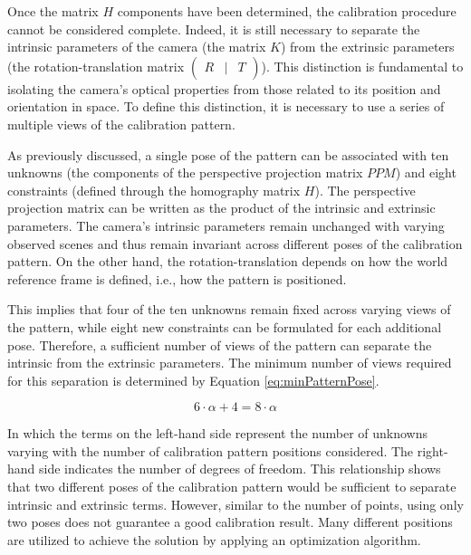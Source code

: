 Once the matrix $H$ components have been determined, the calibration procedure cannot be considered complete. Indeed, it is still necessary to separate the intrinsic parameters of the camera (the matrix $K$) from the extrinsic parameters (the rotation-translation matrix $\begin{pmatrix} R & | & T \end{pmatrix}$).  
This distinction is fundamental to isolating the camera's optical properties from those related to its position and orientation in space.  
To define this distinction, it is necessary to use a series of multiple views of the calibration pattern.

As previously discussed, a single pose of the pattern can be associated with ten unknowns (the components of the perspective projection matrix $PPM$) and eight constraints (defined through the homography matrix $H$).  
The perspective projection matrix can be written as the product of the intrinsic and extrinsic parameters.  
The camera's intrinsic parameters remain unchanged with varying observed scenes and thus remain invariant across different poses of the calibration pattern.  
On the other hand, the rotation-translation depends on how the world reference frame is defined, i.e., how the pattern is positioned.

This implies that four of the ten unknowns remain fixed across varying views of the pattern, while eight new constraints can be formulated for each additional pose.  
Therefore, a sufficient number of views of the pattern can separate the intrinsic from the extrinsic parameters.  
The minimum number of views required for this separation is determined by Equation \ref{eq:minPatternPose}.

\begin{equation} 
  \label{eq:minPatternPose}
  6 \cdot \alpha + 4 = 8 \cdot \alpha  
\end{equation}

In which the terms on the left-hand side represent the number of unknowns varying with the number of calibration pattern positions considered. The right-hand side indicates the number of degrees of freedom.  
This relationship shows that two different poses of the calibration pattern would be sufficient to separate intrinsic and extrinsic terms.  
However, similar to the number of points, using only two poses does not guarantee a good calibration result. Many different positions are utilized to achieve the solution by applying an optimization algorithm.


